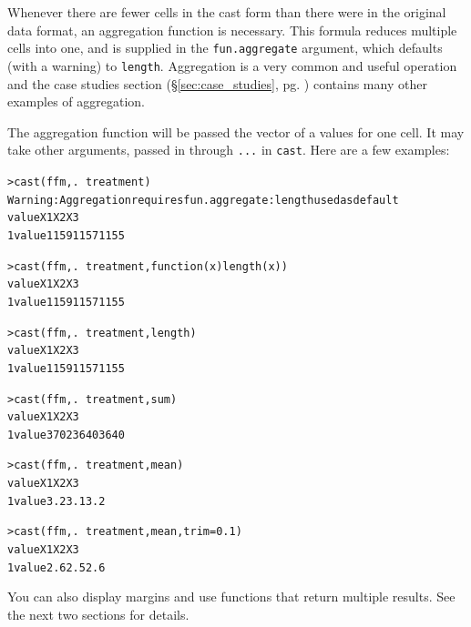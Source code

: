 \documentclass[oneside,letterpaper]{scrartcl}
\newcommand{\secref}[1]{\S \ref{#1}, pg. \pageref{#1}}
\begin{document}
Whenever there are fewer cells in the cast form than there were in the original data format, an aggregation function is necessary.  This formula reduces multiple cells into one, and is supplied in the {\tt fun.aggregate} argument, which defaults (with a warning) to {\tt length}.  Aggregation is a very common and useful operation and the case studies section (\secref{sec:case_studies}) contains many other examples of aggregation.  

The aggregation function will be passed  the vector of a values for one cell.  It may take other arguments, passed in through {\tt ...} in {\tt cast}.  Here are a few examples:

\begin{alltt}
> cast(ffm, . ~ treatment)
Warning:  Aggregation requires fun.aggregate: length used as default 
  value   X1   X2   X3
1 value 1159 1157 1155

> cast(ffm, . ~ treatment, function(x) length(x))
  value   X1   X2   X3
1 value 1159 1157 1155

> cast(ffm, . ~ treatment, length)
  value   X1   X2   X3
1 value 1159 1157 1155

> cast(ffm, . ~ treatment, sum)
  value   X1   X2   X3
1 value 3702 3640 3640

> cast(ffm, . ~ treatment, mean)
  value  X1  X2  X3
1 value 3.2 3.1 3.2

> cast(ffm, . ~ treatment, mean, trim = 0.1)
  value  X1  X2  X3
1 value 2.6 2.5 2.6

\end{alltt}

You can also display margins and use functions that return multiple results.  See the next two sections for details.

%
%
%
%
%
\end{document}
